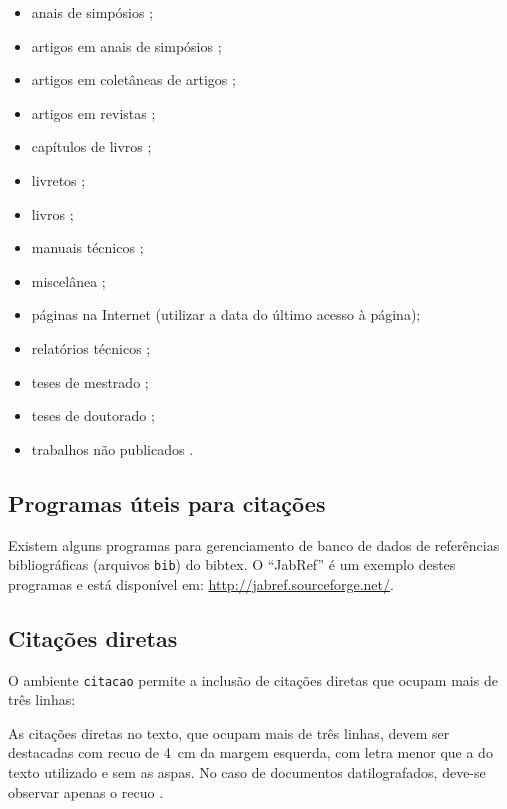 \begin{itemize}%
    \item anais de simpósios \citep{Alt1995,Pirmez2002};
    \item artigos em anais de simpósios \citep{Faina2001};
    \item artigos em coletâneas de artigos \citep{Pinto2000};
    \item artigos em revistas \citep{Guimaraes2003};
    \item capítulos de livros \citep{Santos2000};
    \item livretos \citep{Thompson2001};
    \item livros \citep{Pedrycz1998};
    \item manuais técnicos \citep{IONA1999};
    \item miscelânea \citep{Cruz2003};
    \item páginas na Internet \cite[acessado em 1 de janeiro de 2004]{Larsson2003} (utilizar a data do último acesso à página);
    \item relatórios técnicos \citep{OMG2000};
    \item teses de mestrado \citep{SantosFilho2003};
    \item teses de doutorado \citep{Faina2000};
    \item trabalhos não publicados \citep{Sichman2002}.
\end{itemize}

\subsection{Programas úteis para citações}\label{sec:progUteisCitacoes}

Existem alguns programas para gerenciamento de banco de dados de referências bibliográficas (arquivos \texttt{bib}) do \gls{bibtex}. O ``JabRef'' é um exemplo destes programas e está disponível em: \url{http://jabref.sourceforge.net/}.

\subsection{Citações diretas}\label{sec:citacoesdiretas}

O ambiente \texttt{citacao} permite a inclusão de citações diretas que ocupam mais de três linhas:

\begin{citacao}%
    As citações diretas no texto, que ocupam mais de três linhas, devem ser destacadas com recuo de \SI{4}{cm} da margem esquerda, com letra menor que a do texto utilizado e sem as aspas. No caso de documentos datilografados, deve-se observar apenas o recuo \cite[subseção 5.3]{NBR10520:2002}.
\end{citacao}

